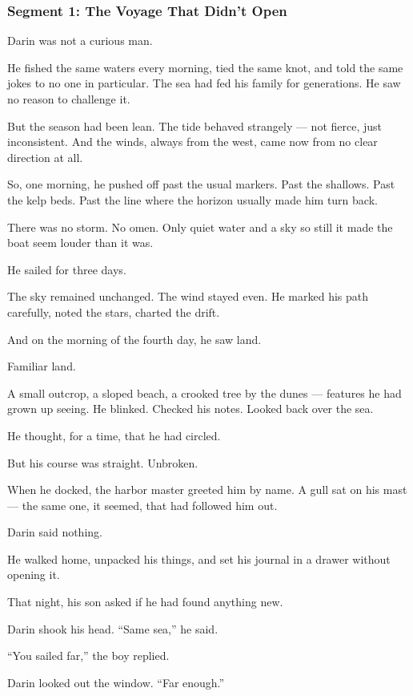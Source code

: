 \documentclass[9pt]{article}
\begin{document}
\newpage

\subsubsection*{Segment 1: The Voyage That Didn’t Open}

Darin was not a curious man.

He fished the same waters every morning, tied the same knot, and told the same jokes to no one in particular. The sea had fed his family for generations. He saw no reason to challenge it.

But the season had been lean. The tide behaved strangely — not fierce, just inconsistent. And the winds, always from the west, came now from no clear direction at all.

So, one morning, he pushed off past the usual markers. Past the shallows. Past the kelp beds. Past the line where the horizon usually made him turn back.

There was no storm. No omen. Only quiet water and a sky so still it made the boat seem louder than it was.

He sailed for three days.

The sky remained unchanged. The wind stayed even. He marked his path carefully, noted the stars, charted the drift.

And on the morning of the fourth day, he saw land.

Familiar land.

A small outcrop, a sloped beach, a crooked tree by the dunes — features he had grown up seeing. He blinked. Checked his notes. Looked back over the sea.

He thought, for a time, that he had circled.

But his course was straight. Unbroken.

When he docked, the harbor master greeted him by name. A gull sat on his mast — the same one, it seemed, that had followed him out.

Darin said nothing.

He walked home, unpacked his things, and set his journal in a drawer without opening it.

That night, his son asked if he had found anything new.

Darin shook his head. ``Same sea,'' he said.

``You sailed far,'' the boy replied.

Darin looked out the window. ``Far enough.''
\end{document}
